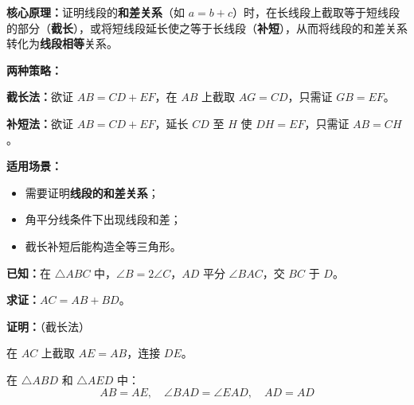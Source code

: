 \documentclass[12pt, a4paper]{ctexart}
\begin{document}
\begin{knowledgebox}[什么是截长补短法？]
\textbf{核心原理：}证明线段的\textbf{和差关系}（如 \(a = b + c\)）时，在长线段上截取等于短线段的部分（\textbf{截长}），或将短线段延长使之等于长线段（\textbf{补短}），从而将线段的和差关系转化为\textbf{线段相等}关系。

\medskip
\noindent\textbf{两种策略：}

\textbf{截长法：}欲证 \(AB = CD + EF\)，在 \(AB\) 上截取 \(AG = CD\)，只需证 \(GB = EF\)。

\textbf{补短法：}欲证 \(AB = CD + EF\)，延长 \(CD\) 至 \(H\) 使 \(DH = EF\)，只需证 \(AB = CH\)。

\medskip
\noindent\textbf{适用场景：}
\begin{itemize}[leftmargin=1.5em]
  \item 需要证明\textbf{线段的和差关系}；
  \item 角平分线条件下出现线段和差；
  \item 截长补短后能构造全等三角形。
\end{itemize}
\end{knowledgebox}

\begin{examplebox}
\textbf{已知：}在 \(\triangle ABC\) 中，\(\angle B = 2\angle C\)，\(AD\) 平分 \(\angle BAC\)，交 \(BC\) 于 \(D\)。

\textbf{求证：}\(AC = AB + BD\)。
\end{examplebox}

\noindent\textbf{证明：}（截长法）

在 \(AC\) 上截取 \(AE = AB\)，连接 \(DE\)。

\begin{center}
\end{center}

在 \(\triangle ABD\) 和 \(\triangle AED\) 中：
\[AB = AE, \quad \angle BAD = \angle EAD, \quad AD = AD\]
\end{document}
